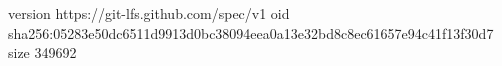 version https://git-lfs.github.com/spec/v1
oid sha256:05283e50dc6511d9913d0bc38094eea0a13e32bd8c8ec61657e94c41f13f30d7
size 349692
